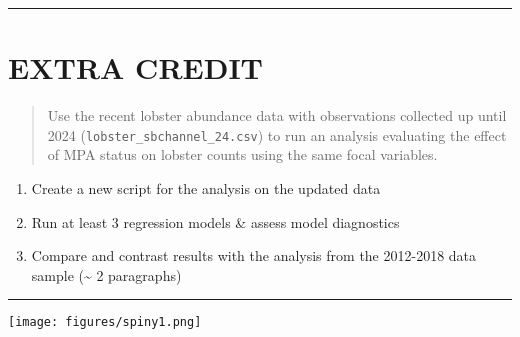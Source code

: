 \documentclass[
]{article}
\providecommand{\tightlist}{%
  \setlength{\itemsep}{0pt}\setlength{\parskip}{0pt}}
\begin{document}
\begin{center}\rule{0.5\linewidth}{0.5pt}\end{center}

\section{EXTRA CREDIT}\label{extra-credit}

\begin{quote}
Use the recent lobster abundance data with observations collected up
until 2024 (\texttt{lobster\_sbchannel\_24.csv}) to run an analysis
evaluating the effect of MPA status on lobster counts using the same
focal variables.
\end{quote}

\begin{enumerate}
\def\labelenumi{\alph{enumi}.}
\tightlist
\item
  Create a new script for the analysis on the updated data
\item
  Run at least 3 regression models \& assess model diagnostics
\item
  Compare and contrast results with the analysis from the 2012-2018 data
  sample (\textasciitilde{} 2 paragraphs)
\end{enumerate}

\begin{center}\rule{0.5\linewidth}{0.5pt}\end{center}

\texttt{[image: figures/spiny1.png]}
\end{document}

